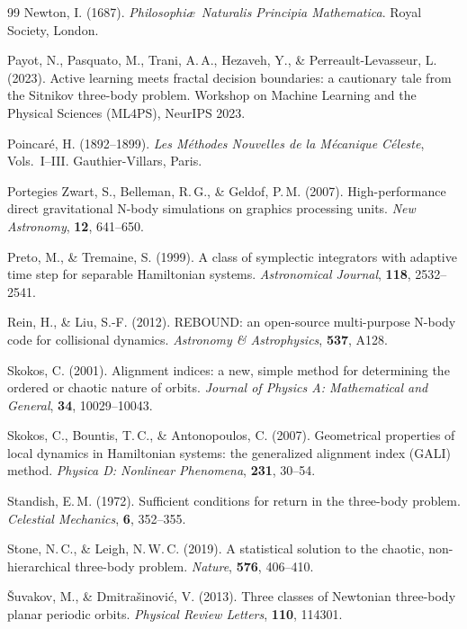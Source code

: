 \documentclass[11pt,a4paper]{article}
\begin{document}
\begin{thebibliography}{99}
Newton, I. (1687).
\textit{Philosophi\ae\ Naturalis Principia Mathematica}.
Royal Society, London.

Payot, N., Pasquato, M., Trani, A.\,A., Hezaveh, Y., \& Perreault-Levasseur, L. (2023).
Active learning meets fractal decision boundaries: a cautionary tale from the Sitnikov three-body problem.
Workshop on Machine Learning and the Physical Sciences (ML4PS), NeurIPS 2023.

Poincar\'{e}, H. (1892--1899).
\textit{Les M\'{e}thodes Nouvelles de la M\'{e}canique C\'{e}leste}, Vols.\ I--III.
Gauthier-Villars, Paris.

Portegies Zwart, S., Belleman, R.\,G., \& Geldof, P.\,M. (2007).
High-performance direct gravitational N-body simulations on graphics processing units.
\textit{New Astronomy}, \textbf{12}, 641--650.

Preto, M., \& Tremaine, S. (1999).
A class of symplectic integrators with adaptive time step for separable Hamiltonian systems.
\textit{Astronomical Journal}, \textbf{118}, 2532--2541.

Rein, H., \& Liu, S.-F. (2012).
REBOUND: an open-source multi-purpose N-body code for collisional dynamics.
\textit{Astronomy \& Astrophysics}, \textbf{537}, A128.

Skokos, C. (2001).
Alignment indices: a new, simple method for determining the ordered or chaotic nature of orbits.
\textit{Journal of Physics A: Mathematical and General}, \textbf{34}, 10029--10043.

Skokos, C., Bountis, T.\,C., \& Antonopoulos, C. (2007).
Geometrical properties of local dynamics in Hamiltonian systems: the generalized alignment index (GALI) method.
\textit{Physica D: Nonlinear Phenomena}, \textbf{231}, 30--54.

Standish, E.\,M. (1972).
Sufficient conditions for return in the three-body problem.
\textit{Celestial Mechanics}, \textbf{6}, 352--355.

Stone, N.\,C., \& Leigh, N.\,W.\,C. (2019).
A statistical solution to the chaotic, non-hierarchical three-body problem.
\textit{Nature}, \textbf{576}, 406--410.

{\v{S}}uvakov, M., \& Dmitra{\v{s}}inovi{\'c}, V. (2013).
Three classes of Newtonian three-body planar periodic orbits.
\textit{Physical Review Letters}, \textbf{110}, 114301.


\end{thebibliography}
\end{document}

